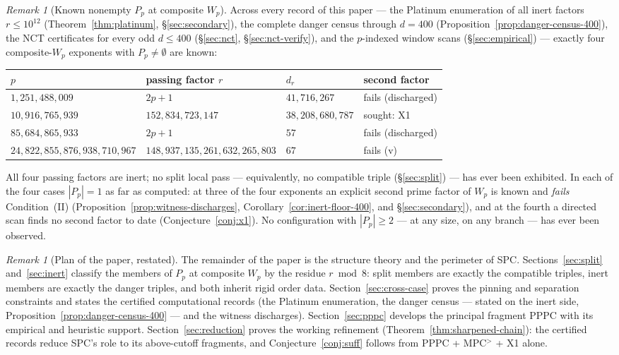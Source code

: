 \documentclass[11pt]{amsart}
\theoremstyle{plain}
\theoremstyle{definition}
\theoremstyle{remark}
\newtheorem{remark}[theorem]{Remark}
\numberwithin{equation}{section}
\begin{document}
\begin{remark}[Known nonempty $P_p$ at composite $W_p$]\label{rem:known-passers}
Across every record of this paper --- the Platinum enumeration of all
inert factors $r \leq 10^{12}$ (Theorem~\ref{thm:platinum},
\S\ref{sec:secondary}), the complete danger census through $d = 400$
(Proposition~\ref{prop:danger-census-400}), the NCT certificates for
every odd $d \leq 400$ (\S\ref{sec:nct}, \S\ref{sec:nct-verify}), and
the $p$-indexed window scans (\S\ref{sec:empirical}) --- exactly four
composite-$W_p$ exponents with $P_p \neq \emptyset$ are known:

\begin{center}
\footnotesize
\setlength{\tabcolsep}{2pt}
\begin{tabular}{@{}llll@{}}
\hline
$p$ & passing factor $r$ & $d_r$ & second factor \\
\hline
$1{,}251{,}488{,}009$ & $2p+1$ & $41{,}716{,}267$ & fails (discharged) \\
$10{,}916{,}765{,}939$ & $152{,}834{,}723{,}147$ & $38{,}208{,}680{,}787$ & sought: X1 \\
$85{,}684{,}865{,}933$ & $2p+1$ & $57$ & fails (discharged) \\
$24{,}822{,}855{,}876{,}938{,}710{,}967$ & $148{,}937{,}135{,}261{,}632{,}265{,}803$ & $67$ & fails (v) \\
\hline
\end{tabular}
\end{center}

All four passing factors are inert; no split local pass --- equivalently,
no compatible triple (\S\ref{sec:split}) --- has ever been exhibited. In
each of the four cases $|P_p| = 1$ as far as computed: at three of the
four exponents an explicit second prime factor of $W_p$ is known and
\emph{fails} Condition~(II) (Proposition~\ref{prop:witness-discharges},
Corollary~\ref{cor:inert-floor-400}, and \S\ref{sec:secondary}), and at
the fourth a directed scan finds no
second factor to date (Conjecture~\ref{conj:x1}). No configuration with
$|P_p| \geq 2$ --- at any size, on any branch --- has ever been observed.
\end{remark}

\begin{remark}[Plan of the paper, restated]\label{rem:spc-plan}
The remainder of the paper is the structure theory and the perimeter of
SPC. Sections~\ref{sec:split} and~\ref{sec:inert} classify the members
of $P_p$ at composite $W_p$ by the residue $r \bmod 8$: split members
are exactly the compatible triples, inert members are exactly the danger
triples, and both inherit rigid order data. Section~\ref{sec:cross-case}
proves the pinning and separation constraints and states the certified
computational records (the Platinum enumeration, the danger census ---
stated on the inert side, Proposition~\ref{prop:danger-census-400} ---
and the witness discharges). Section~\ref{sec:pppc} develops the
principal fragment PPPC with its empirical and heuristic support.
Section~\ref{sec:reduction} proves the working refinement
(Theorem~\ref{thm:sharpened-chain}): the certified records reduce SPC's
role to its above-cutoff fragments, and Conjecture~\ref{conj:suff}
follows from PPPC + MPC$^{>}$ + X1 alone.
\end{remark}
\end{document}
